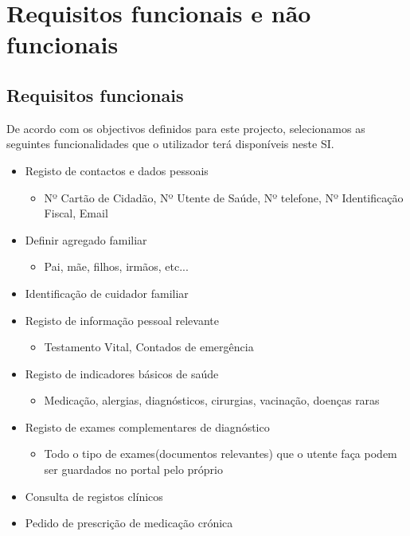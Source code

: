 \documentclass[12pt, a4paper, twoside]{report} %
\begin{document}
\section{Requisitos funcionais e não funcionais}

\subsection{Requisitos funcionais}

De acordo com os objectivos definidos para este projecto, selecionamos as seguintes funcionalidades que o utilizador terá disponíveis neste SI.

\begin{itemize}

\item Registo de contactos e dados pessoais
	\begin{itemize}
	\item Nº Cartão de Cidadão, Nº Utente de Saúde, Nº telefone, Nº Identificação Fiscal, Email
	\end{itemize}
\item Definir agregado familiar
	\begin{itemize}
	\item Pai, mãe, filhos, irmãos, etc...
	\end{itemize} 
\item Identificação de cuidador familiar 
\item Registo de informação pessoal relevante
	\begin{itemize}
	\item Testamento Vital, Contados de emergência
	\end{itemize}
\item Registo de indicadores básicos de saúde
	\begin{itemize}
	\item Medicação, alergias, diagnósticos, cirurgias, vacinação, doenças raras
	\end{itemize}
\item Registo de exames complementares de diagnóstico
	\begin{itemize}
	\item Todo o tipo de exames(documentos relevantes) que o utente faça podem ser guardados no portal pelo próprio
	\end{itemize}
\item Consulta de registos clínicos
\item Pedido de prescrição de medicação crónica
	\begin{itemize}

\end{itemize}
\end{itemize}
\end{document}

